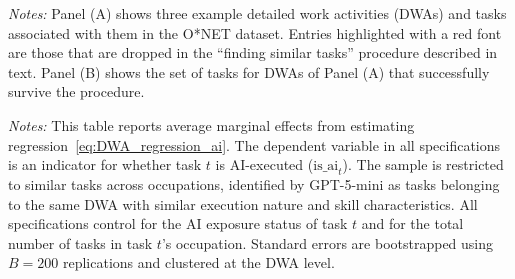\newpage
\begin{landscape}
\begin{table}[p]
\caption{Example DWAs with Tasks in Multiple Occupations and the Tasks Surviving the ``Finding Similar Tasks'' Procedure}
\label{tab:DWA_tasks}
\hspace{-13cm}

\vspace{0.3cm}

\raggedright \footnotesize{\emph{Notes:} Panel (A) shows three example detailed work activities (DWAs) and tasks associated with them in the O*NET dataset. 
Entries highlighted with a red font are those that are dropped in the ``finding similar tasks'' procedure described in text. 
Panel (B) shows the set of tasks for DWAs of Panel (A) that successfully survive the procedure.}
\end{table}
\end{landscape}



\newpage
\setcounter{table}{2}
\begin{table}[ht!]
\begin{center}
\caption{Effect of Neighboring Tasks' AI Execution Status on Task's AI Execution Likelihood (GPT-filtered Sample)}
\label{tab:DWA_regression_aiExecution_GPTsample}
\resizebox{\textwidth}{!}{

}
\end{center}
\raggedright \footnotesize{\emph{Notes:}} 
This table reports average marginal effects from estimating regression~\eqref{eq:DWA_regression_ai}.  
The dependent variable in all specifications is an indicator for whether task $t$ is AI-executed ($\text{is\_ai}_{t}$).  
The sample is restricted to similar tasks across occupations, identified by GPT-5-mini as tasks belonging to the same DWA with similar execution nature and skill characteristics.  
All specifications control for the AI exposure status of task $t$ and for the total number of tasks in task $t$'s occupation.
Standard errors are bootstrapped using $B=200$ replications and clustered at the DWA level.  
\end{table}



